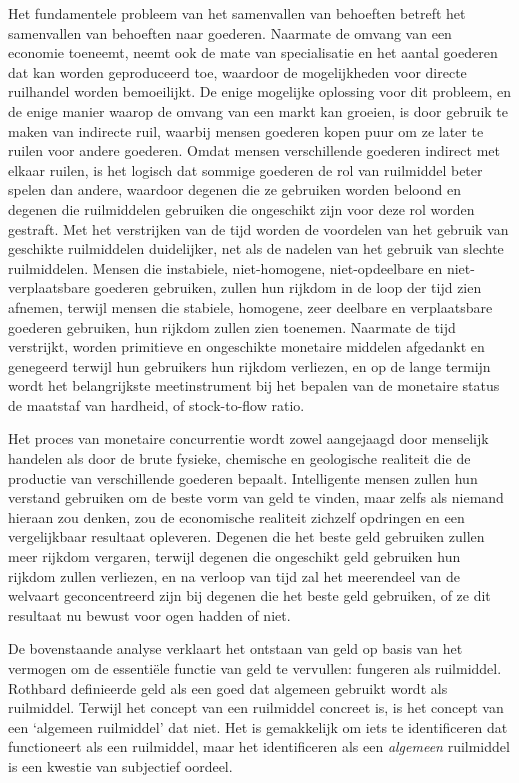 \documentclass[
  a5paper,
  smalldemyvopaper,11pt,twoside,onecolumn,openright,extrafontsizes,
hidelinks]{memoir}
\begin{document}
Het fundamentele probleem van het samenvallen van behoeften betreft het
samenvallen van behoeften naar goederen. Naarmate de omvang van een
economie toeneemt, neemt ook de mate van specialisatie en het aantal
goederen dat kan worden geproduceerd toe, waardoor de mogelijkheden voor
directe ruilhandel worden bemoeilijkt. De enige mogelijke oplossing voor
dit probleem, en de enige manier waarop de omvang van een markt kan
groeien, is door gebruik te maken van indirecte ruil, waarbij mensen
goederen kopen puur om ze later te ruilen voor andere goederen. Omdat
mensen verschillende goederen indirect met elkaar ruilen, is het logisch
dat sommige goederen de rol van ruilmiddel beter spelen dan andere,
waardoor degenen die ze gebruiken worden beloond en degenen die
ruilmiddelen gebruiken die ongeschikt zijn voor deze rol worden
gestraft. Met het verstrijken van de tijd worden de voordelen van het
gebruik van geschikte ruilmiddelen duidelijker, net als de nadelen van
het gebruik van slechte ruilmiddelen. Mensen die instabiele,
niet-homogene, niet-opdeelbare en niet-verplaatsbare goederen gebruiken,
zullen hun rijkdom in de loop der tijd zien afnemen, terwijl mensen die
stabiele, homogene, zeer deelbare en verplaatsbare goederen gebruiken,
hun rijkdom zullen zien toenemen. Naarmate de tijd verstrijkt, worden
primitieve en ongeschikte monetaire middelen afgedankt en genegeerd
terwijl hun gebruikers hun rijkdom verliezen, en op de lange termijn
wordt het belangrijkste meetinstrument bij het bepalen van de monetaire
status de maatstaf van hardheid, of stock-to-flow ratio.

Het proces van monetaire concurrentie wordt zowel aangejaagd door
menselijk handelen als door de brute fysieke, chemische en geologische
realiteit die de productie van verschillende goederen bepaalt.
Intelligente mensen zullen hun verstand gebruiken om de beste vorm van
geld te vinden, maar zelfs als niemand hieraan zou denken, zou de
economische realiteit zichzelf opdringen en een vergelijkbaar resultaat
opleveren. Degenen die het beste geld gebruiken zullen meer rijkdom
vergaren, terwijl degenen die ongeschikt geld gebruiken hun rijkdom
zullen verliezen, en na verloop van tijd zal het meerendeel van de
welvaart geconcentreerd zijn bij degenen die het beste geld gebruiken,
of ze dit resultaat nu bewust voor ogen hadden of niet.

De bovenstaande analyse verklaart het ontstaan van geld op basis van het
vermogen om de essentiële functie van geld te vervullen: fungeren als
ruilmiddel. Rothbard definieerde geld als een goed dat algemeen gebruikt
wordt als ruilmiddel. Terwijl het concept van een ruilmiddel concreet
is, is het concept van een `algemeen ruilmiddel' dat niet. Het is
gemakkelijk om iets te identificeren dat functioneert als een
ruilmiddel, maar het identificeren als een \emph{algemeen} ruilmiddel is
een kwestie van subjectief oordeel.
\end{document}
